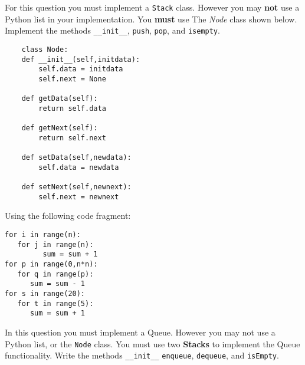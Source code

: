\documentclass[11pt]{exam}
\begin{document}
\begin{questions}
\newpage

\question[10] For this question you must implement a \texttt{Stack} class.  However you may \textbf{not} use a Python list in your implementation.  You \textbf{must} use The \textit{Node}  class shown below.   Implement the methods \verb!__init__!, \texttt{push}, \texttt{pop}, and \texttt{isempty}.
\begin{verbatim}
	class Node:
    def __init__(self,initdata):
        self.data = initdata
        self.next = None

    def getData(self):
        return self.data

    def getNext(self):
        return self.next

    def setData(self,newdata):
        self.data = newdata

    def setNext(self,newnext):
        self.next = newnext
\end{verbatim}

\newpage




\question Using the following code fragment:
\begin{lstlisting}
for i in range(n):
   for j in range(n):
         sum = sum + 1
for p in range(0,n*n):
   for q in range(p):
      sum = sum - 1
for s in range(20):
   for t in range(5):
      sum = sum + 1
\end{lstlisting}

\newpage
\question[10]  In this question you must implement a Queue.  However you may not use a Python list, or the \texttt{Node} class.  You must use two \textbf{Stacks} to implement the Queue functionality.  Write the methods \verb~__init__~ \texttt{enqueue}, \texttt{dequeue}, and \texttt{isEmpty}.

\end{questions}
\end{document}
